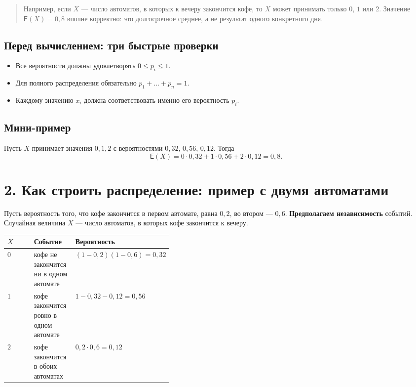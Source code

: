 \documentclass[a4paper,12pt]{article}
\newcommand{\E}{\mathsf{E}}
\newcommand{\sectionline}{\par\vspace{0.2em}{\color{accent}\hrule height 0.6pt}\vspace{0.5em}}
\newcommand{\smallnote}[1]{\begin{quote}\small\color{textgray}#1\end{quote}}
\begin{document}
\smallnote{Например, если $X$ --- число автоматов, в которых к вечеру закончится кофе, то $X$ может принимать только $0$, $1$ или $2$. Значение $\E(X)=0{,}8$ вполне корректно: это долгосрочное среднее, а не результат одного конкретного дня.}

\subsection*{Перед вычислением: три быстрые проверки}
\begin{itemize}
  \item Все вероятности должны удовлетворять $0\le p_i\le 1$.
  \item Для полного распределения обязательно $p_1+\dots+p_n=1$.
  \item Каждому значению $x_i$ должна соответствовать именно его вероятность $p_i$.
\end{itemize}

\subsection*{Мини-пример}
Пусть $X$ принимает значения $0,1,2$ с вероятностями $0{,}32$, $0{,}56$, $0{,}12$. Тогда
\[
\E(X)=0\cdot0{,}32+1\cdot0{,}56+2\cdot0{,}12=0{,}8.
\]

\clearpage

\section*{2. Как строить распределение: пример с двумя автоматами}
\sectionline

Пусть вероятность того, что кофе закончится в первом автомате, равна $0{,}2$, во втором --- $0{,}6$. \textbf{Предполагаем независимость} событий. Случайная величина $X$ --- число автоматов, в которых кофе закончится к вечеру.

\begin{center}
\begin{tabularx}{0.88\linewidth}{>{\centering\arraybackslash}p{0.16\linewidth}X>{\centering\arraybackslash}p{0.23\linewidth}}
\toprule
$X$ & Событие & Вероятность \\
\midrule
$0$ & кофе не закончится ни в одном автомате & $(1-0{,}2)(1-0{,}6)=0{,}32$ \\
$1$ & кофе закончится ровно в одном автомате & $1-0{,}32-0{,}12=0{,}56$ \\
$2$ & кофе закончится в обоих автоматах & $0{,}2\cdot0{,}6=0{,}12$ \\
\bottomrule
\end{tabularx}
\end{center}
\end{document}
